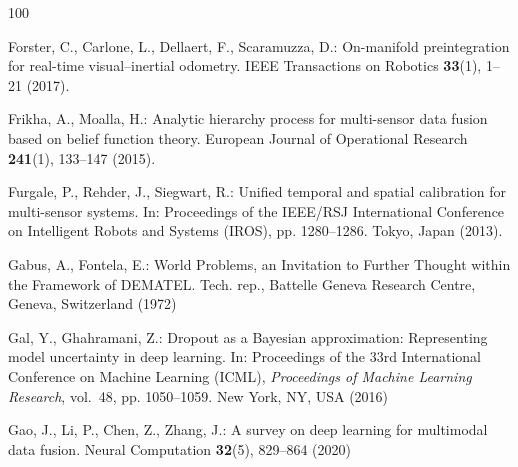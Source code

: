 \documentclass[graybox,envcountchap]{style/SNmono}
\begin{document}
\begin{thebibliography}{100}
{\par}

Forster, C., Carlone, L., Dellaert, F., Scaramuzza, D.: On-manifold
  preintegration for real-time visual--inertial odometry.
\newblock IEEE Transactions on Robotics \textbf{33}(1), 1--21 (2017).
\newblock {}



Frikha, A., Moalla, H.: Analytic hierarchy process for multi-sensor data fusion
  based on belief function theory.
\newblock European Journal of Operational Research \textbf{241}(1), 133--147
  (2015).
\newblock {}



Furgale, P., Rehder, J., Siegwart, R.: Unified temporal and spatial calibration
  for multi-sensor systems.
\newblock In: Proceedings of the IEEE/RSJ International Conference on
  Intelligent Robots and Systems (IROS), pp. 1280--1286. Tokyo, Japan (2013).
\newblock {}



Gabus, A., Fontela, E.: {World Problems, an Invitation to Further Thought
  within the Framework of DEMATEL}.
\newblock Tech. rep., Battelle Geneva Research Centre, Geneva, Switzerland
  (1972)


{\color{red} 
Gal, Y., Ghahramani, Z.: Dropout as a {B}ayesian approximation: Representing
  model uncertainty in deep learning.
\newblock In: Proceedings of the 33rd International Conference on Machine
  Learning (ICML), \emph{Proceedings of Machine Learning Research}, vol.~48,
  pp. 1050--1059. New York, NY, USA (2016)

\par}
{\color{red} 
Gao, J., Li, P., Chen, Z., Zhang, J.: A survey on deep learning for multimodal
  data fusion.
\newblock Neural Computation \textbf{32}(5), 829--864 (2020)

}
\end{thebibliography}
\end{document}

